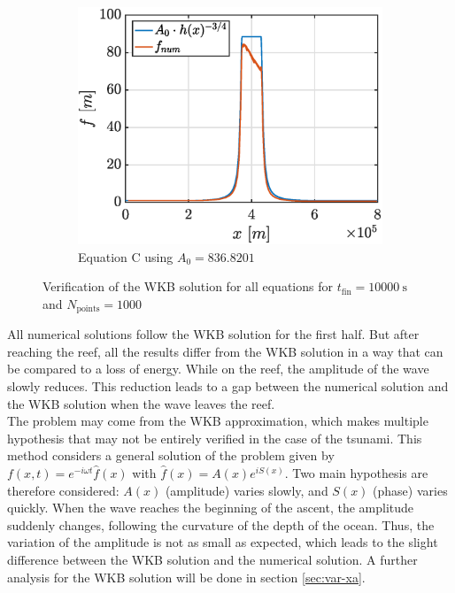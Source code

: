 \documentclass[a4paper,12pt,twoside]{article}
\begin{document}
\begin{figure}[h]
\begin{subfigure}{0.45\textwidth}
          \label{fig:tsunami-amp-B}
        \end{subfigure}\\
        \centering
        \begin{subfigure}{0.45\textwidth}
          \centering
          \includegraphics[width=\textwidth]{graphs/tsunami_amp_C.eps}
          \caption{Equation C using $A_0 = \num{836.8201}$}
          \label{fig:tsunami-amp-C}
        \end{subfigure}
        \caption{Verification of the WKB solution for all equations for $t_\text{fin} = \SI{10000}{\s}$ and $N_\text{points} = \num{1000}$} %
        \label{fig:tsunami-amp}
      \end{figure}

      All numerical solutions follow the WKB solution for the first half.
      But after reaching the reef, all the results differ from the WKB solution in a way that can be compared to a loss of energy.
      While on the reef, the amplitude of the wave slowly reduces.
      This reduction leads to a gap between the numerical solution and the WKB solution when the wave leaves the reef.\\

      The problem may come from the WKB approximation, which makes multiple hypothesis that may not be entirely verified in the case of the tsunami.
      This method considers a general solution of the problem given by $f(x,t)=e^{-i\omega t}\hat{f}(x)$ with $\hat{f}(x) = A(x)e^{iS(x)}$.
      Two main hypothesis are therefore considered: $A(x)$ (amplitude) varies slowly, and $S(x)$ (phase) varies quickly.
      When the wave reaches the beginning of the ascent, the amplitude suddenly changes, following the curvature of the depth of the ocean.
      Thus, the variation of the amplitude is not as small as expected, which leads to the slight difference between the WKB solution and the numerical solution.
      A further analysis for the WKB solution will be done in section \ref{sec:var-xa}.
\end{document}
